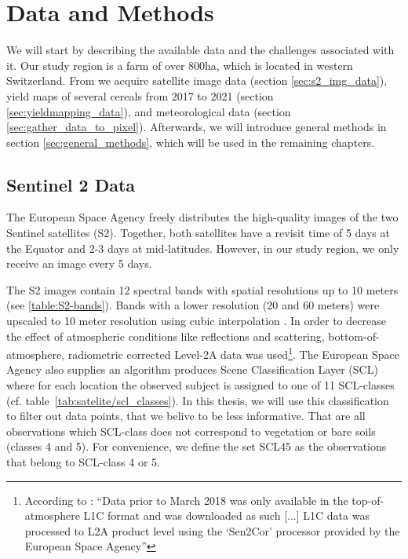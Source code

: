 \chapter{Data and Methods}\label{sec:data_methods}
{
	We will start by describing the available data and the challenges associated with it.
	Our study region is a farm of over 800ha, which is located in western Switzerland. From \cite{perichPixelbasedCropYield2022}  we acquire satellite image data (section \ref{sec:s2_img_data}), yield maps of several cereals from 2017 to 2021 (section \ref{sec:yieldmapping_data}), and meteorological data (section \ref{sec:gather_data_to_pixel}).
	Afterwards, we will introduce general methods in section \ref{sec:general_methods}, which will be used in the remaining chapters.
}


\section{Sentinel 2 Data}{
	\label{sec:s2_img_data}
	{
		The European Space Agency \citep{esaSentinel22022} freely distributes the high-quality images of the two Sentinel satellites (S2). Together, both satellites have a revisit time of 5 days at the Equator and 2-3 days at mid-latitudes. However, in our study region, we only receive an image every 5 days.
		
		
		
		The S2 images contain 12 spectral bands with spatial resolutions up to 10 meters (see \ref{table:S2-bands}). Bands with a lower resolution (20 and 60 meters) were upscaled to 10 meter resolution using cubic interpolation \citep{perichPixelbasedCropYield2022}. In order to decrease the effect of atmospheric conditions like reflections and scattering, bottom-of-atmosphere, radiometric corrected Level-2A data was used\footnote{According to \cite{perichPixelbasedCropYield2022}: ``Data prior to March 2018 was only available in the top-of-atmosphere L1C format and was downloaded as such [...] L1C data was processed to L2A product level using the `Sen2Cor' processor provided by the European Space Agency''}. 
		The European Space Agency also supplies an algorithm \citep{esaLevel2AAlgorithmOverview2022} produces Scene Classification Layer ({SCL}) where for each location the observed subject is assigned to one of 11 SCL-classes (cf. table~\ref{tab:satelite/scl_classes}). 
		In this thesis,  we will use this classification to filter out data points, that we belive to be less informative. That are all observations which SCL-class does not correspond to vegetation or bare soils (classes 4 and 5). For convenience, we define the set SCL45 as the observations that belong to SCL-class 4 or 5.
		
}}
